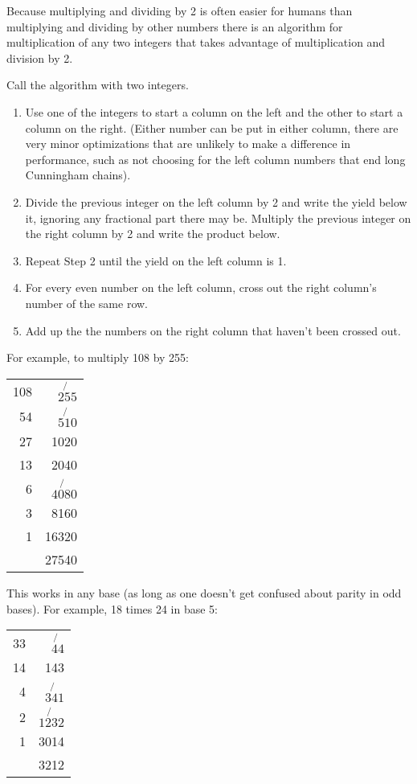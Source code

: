 \documentclass[12pt]{article}
\begin{document}
Because multiplying and dividing by 2 is often easier for humans than multiplying and dividing by other numbers there is an algorithm for multiplication of any two integers that takes advantage of multiplication and division by 2.

Call the algorithm with two integers.

\begin{enumerate}
\item Use one of the integers to start a column on the left and the other to start a column on the right. (Either number can be put in either column, there are very minor optimizations that are unlikely to make a difference in performance, such as not choosing for the left column numbers that end long Cunningham chains).
\item Divide the previous integer on the left column by 2 and write the yield below it, ignoring any fractional part there may be. Multiply the previous integer on the right column by 2 and write the product below.
\item Repeat Step 2 until the yield on the left column is 1.
\item For every even number on the left column, cross out the right column's number of the same row.
\item Add up the the numbers on the right column that haven't been crossed out.
\end{enumerate}

For example, to multiply 108 by 255:

\begin{tabular}{|r|r|}
108 & $\not{255}$ \\
54 & $\not{510}$ \\
27 & 1020 \\
13 & 2040 \\
6 & $\not{4080}$ \\
3 & 8160 \\
1 & 16320 \\
 & 27540 \\
\end{tabular}

This works in any base (as long as one doesn't get confused about parity in odd bases). For example, 18 times 24 in base 5:

\begin{tabular}{|r|r|}
33 & $\not{44}$ \\
14 & 143 \\
4 & $\not{341}$ \\
2 & $\not{1232}$ \\
1 & 3014 \\
 & 3212
\end{tabular}
 
\end{document}
